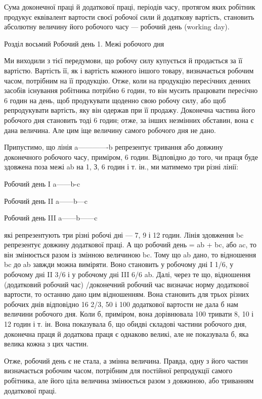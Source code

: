 Сума доконечної праці й додаткової праці, періодів часу,
протягом яких робітник продукує еквівалент вартости своєї робочої
сили й додаткову вартість, становить абсолютну величину
його робочого часу — робочий день (working day).

Розділ восьмий
Робочий день
1. Межі робочого дня

Ми виходили з тієї передумови, що робочу силу купується
й продається за її вартістю. Вартість її, як і вартість кожного
іншого товару, визначається робочим часом, потрібним на
її продукцію. Отже, коли на продукцію пересічних денних засобів
існування робітника потрібно 6 годин, то він мусить працювати
пересічно 6 годин на день, щоб продукувати щоденно свою робочу
силу, або щоб репродукувати вартість, яку він одержав при її
продажу. Доконечна частина його робочого дня становить тоді
6 годин; отже, за інших незмінних обставин, вона є дана величина.
Але цим іще величину самого робочого дня не дано.

Припустимо, що лінія a-------------b репрезентує тривання
або довжину доконечного робочого часу, приміром, 6 годин. Відповідно
до того, чи праця буде здовжена поза межі ab на 1, З,
6 годин і т. ін., ми матимемо три різні лінії:

Робочий день I
a------b-c

Робочий день II
a------b---c

Робочий день III
a------b------c

які репрезентують три різні робочі дні — 7, 9 і 12 годин. Лінія
здовження bc репрезентує довжину додаткової праці. А що робочий
день = ab + bc, або ac, то він змінюється разом із змінною
величиною bc. Тому що ab дано, то відношення bc до ab завжди
можна виміряти. Воно становить у робочому дні I 1/6, у робочому
дні II 3/6 і у робочому дні III 6/6 ab. Далі, через те що, відношення
(додатковий робочий час) /доконечний робочий час визначає норму додаткової вартости, то
останню дано цим відношенням. Вона становить для трьох різних
робочих днів відповідно 16 2/3, 50 і 100%
додаткової вартости не дала б нам величини робочого дня. Коли
б, приміром, вона дорівнювала 100%
тривати 8, 10 і 12 годин і т. ін. Вона показувала б, що обидві
складові частини робочого дня, доконечна праця й додаткова
праця є однаково великі, але не показувала б, яка велика кожна
з цих частин.

Отже, робочий день є не стала, а змінна величина. Правда,
одну з його частин визначається робочим часом, потрібним для
постійної репродукції самого робітника, але його ціла величина
змінюється разом з довжиною, або триванням додаткової праці.
